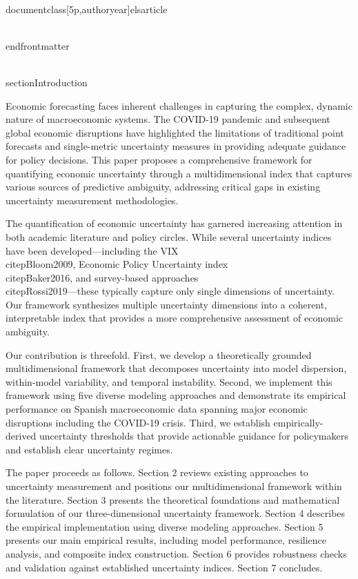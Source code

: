 \\documentclass[5p,authoryear]{elsarticle}
\begin{document}
{\\end{frontmatter}

\\section{Introduction}

Economic forecasting faces inherent challenges in capturing the complex, dynamic nature of macroeconomic systems. The COVID-19 pandemic and subsequent global economic disruptions have highlighted the limitations of traditional point forecasts and single-metric uncertainty measures in providing adequate guidance for policy decisions. This paper proposes a comprehensive framework for quantifying economic uncertainty through a multidimensional index that captures various sources of predictive ambiguity, addressing critical gaps in existing uncertainty measurement methodologies.

The quantification of economic uncertainty has garnered increasing attention in both academic literature and policy circles. While several uncertainty indices have been developed—including the VIX \\citep{Bloom2009}, Economic Policy Uncertainty index \\citep{Baker2016}, and survey-based approaches \\citep{Rossi2019}—these typically capture only single dimensions of uncertainty. Our framework synthesizes multiple uncertainty dimensions into a coherent, interpretable index that provides a more comprehensive assessment of economic ambiguity.

Our contribution is threefold. First, we develop a theoretically grounded multidimensional framework that decomposes uncertainty into model dispersion, within-model variability, and temporal instability. Second, we implement this framework using five diverse modeling approaches and demonstrate its empirical performance on Spanish macroeconomic data spanning major economic disruptions including the COVID-19 crisis. Third, we establish empirically-derived uncertainty thresholds that provide actionable guidance for policymakers and establish clear uncertainty regimes.

The paper proceeds as follows. Section 2 reviews existing approaches to uncertainty measurement and positions our multidimensional framework within the literature. Section 3 presents the theoretical foundations and mathematical formulation of our three-dimensional uncertainty framework. Section 4 describes the empirical implementation using diverse modeling approaches. Section 5 presents our main empirical results, including model performance, resilience analysis, and composite index construction. Section 6 provides robustness checks and validation against established uncertainty indices. Section 7 concludes.

}
\end{document}
